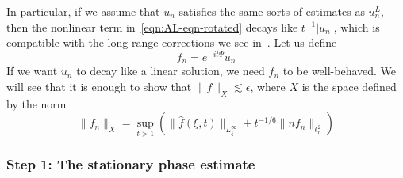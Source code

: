 \documentclass[letterpaper, reqno,final]{amsart}
\newcommand{\discrAvg}{\Psi}
\newcommand{\invLinProp}[1][t]{e^{-i#1\discrAvg}}
\begin{document}
In particular, if we assume that $u_n$ satisfies the same sorts of estimates as $u_n^L$, then the nonlinear term in~\eqref{eqn:AL-eqn-rotated} decays like $t^{-1} |u_n|$, which is compatible with the long range corrections we see in~.  Let us define
$$f_n = \invLinProp u_n$$
If we want $u_n$ to decay like a linear solution, we need $f_n$ to be well-behaved.  We will see that it is enough to show that $\lVert f \rVert_X \lesssim \epsilon$, where $X$ is the space defined by the norm
\begin{equation}\label{eqn:X-norm-def}
    \lVert f_n \rVert_X = \sup_{t > 1} \left(\lVert \hat{f}(\xi,t) \rVert_{L^\infty_{\xi}} + t^{-1/6}\lVert n f_n \rVert_{\ell^2_n}\right)
\end{equation}

\subsubsection{Step 1: The stationary phase estimate}
\end{document}
